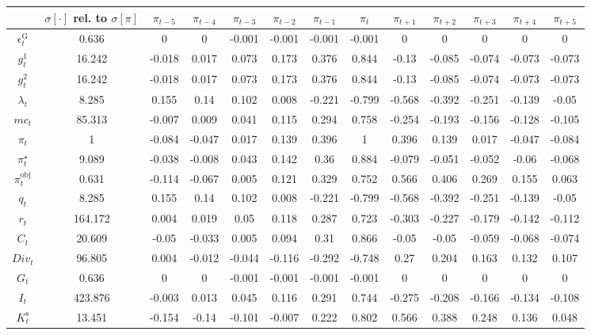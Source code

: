 \begin{tabular}{c|c|c|c|c|c|c|c|c|c|c|c|c|}
  & $\sigma[\cdot]$ rel. to $\sigma[\pi]$ & $\pi_{t-5}$ & $\pi_{t-4}$ & $\pi_{t-3}$ & $\pi_{t-2}$ & $\pi_{t-1}$ & $\pi_{t}$ & $\pi_{t+1}$ & $\pi_{t+2}$ & $\pi_{t+3}$ & $\pi_{t+4}$ & $\pi_{t+5}$\\
\hline
$\epsilon^{\mathrm{G}}_{t}$ & 0.636 & 0 & 0 & -0.001 & -0.001 & -0.001 & -0.001 & 0 & 0 & 0 & 0 & 0 \\
$g^{\mathrm{1}}_{t}$ & 16.242 & -0.018 & 0.017 & 0.073 & 0.173 & 0.376 & 0.844 & -0.13 & -0.085 & -0.074 & -0.073 & -0.073 \\
$g^{\mathrm{2}}_{t}$ & 16.242 & -0.018 & 0.017 & 0.073 & 0.173 & 0.376 & 0.844 & -0.13 & -0.085 & -0.074 & -0.073 & -0.073 \\
$\lambda_{t}$ & 8.285 & 0.155 & 0.14 & 0.102 & 0.008 & -0.221 & -0.799 & -0.568 & -0.392 & -0.251 & -0.139 & -0.05 \\
${m\!c}_{t}$ & 85.313 & -0.007 & 0.009 & 0.041 & 0.115 & 0.294 & 0.758 & -0.254 & -0.193 & -0.156 & -0.128 & -0.105 \\
$\pi_{t}$ & 1 & -0.084 & -0.047 & 0.017 & 0.139 & 0.396 & 1 & 0.396 & 0.139 & 0.017 & -0.047 & -0.084 \\
$\pi^{\star}_{t}$ & 9.089 & -0.038 & -0.008 & 0.043 & 0.142 & 0.36 & 0.884 & -0.079 & -0.051 & -0.052 & -0.06 & -0.068 \\
$\pi^{\mathrm{obj}}_{t}$ & 0.631 & -0.114 & -0.067 & 0.005 & 0.121 & 0.329 & 0.752 & 0.566 & 0.406 & 0.269 & 0.155 & 0.063 \\
$q_{t}$ & 8.285 & 0.155 & 0.14 & 0.102 & 0.008 & -0.221 & -0.799 & -0.568 & -0.392 & -0.251 & -0.139 & -0.05 \\
$r_{t}$ & 164.172 & 0.004 & 0.019 & 0.05 & 0.118 & 0.287 & 0.723 & -0.303 & -0.227 & -0.179 & -0.142 & -0.112 \\
$C_{t}$ & 20.609 & -0.05 & -0.033 & 0.005 & 0.094 & 0.31 & 0.866 & -0.05 & -0.05 & -0.059 & -0.068 & -0.074 \\
${D\!i\!v}_{t}$ & 96.805 & 0.004 & -0.012 & -0.044 & -0.116 & -0.292 & -0.748 & 0.27 & 0.204 & 0.163 & 0.132 & 0.107 \\
$G_{t}$ & 0.636 & 0 & 0 & -0.001 & -0.001 & -0.001 & -0.001 & 0 & 0 & 0 & 0 & 0 \\
$I_{t}$ & 423.876 & -0.003 & 0.013 & 0.045 & 0.116 & 0.291 & 0.744 & -0.275 & -0.208 & -0.166 & -0.134 & -0.108 \\
$K^{\mathrm{s}}_{t}$ & 13.451 & -0.154 & -0.14 & -0.101 & -0.007 & 0.222 & 0.802 & 0.566 & 0.388 & 0.248 & 0.136 & 0.048 \\

\end{tabular}

